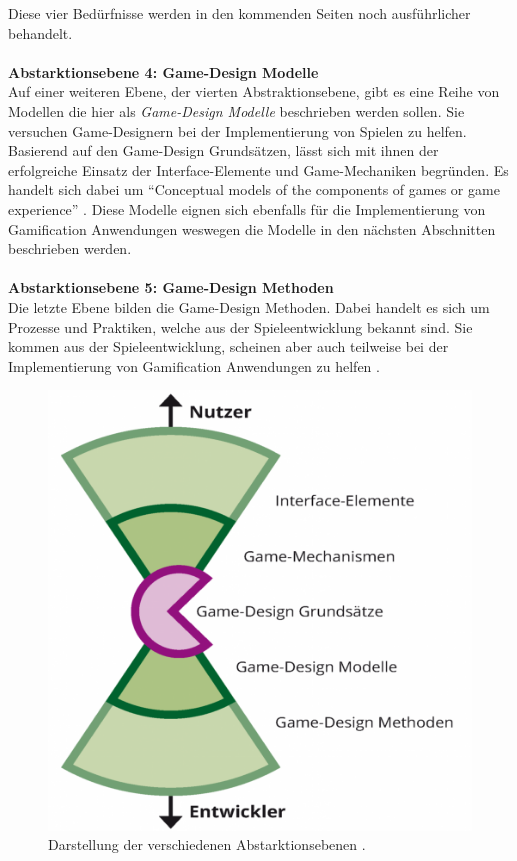 \documentclass[a4paper,12pt]{scrartcl}
\begin{document}
Diese vier Bedürfnisse werden in den kommenden Seiten noch ausführlicher behandelt.
\\\\
\textbf{Abstarktionsebene 4: Game-Design Modelle}
\\
Auf einer weiteren Ebene, der vierten Abstraktionsebene, gibt es eine Reihe von Modellen die hier als \textit{Game-Design Modelle} beschrieben werden sollen. Sie versuchen Game-Designern bei der Implementierung von Spielen zu helfen. Basierend auf den Game-Design Grundsätzen, lässt sich mit ihnen der erfolgreiche Einsatz der Interface-Elemente und Game-Mechaniken begründen. Es handelt sich dabei um \enquote{Conceptual models of the components of games or game experience} \cite{Deterding2011}. Diese Modelle eignen sich ebenfalls für die Implementierung von Gamification Anwendungen weswegen die Modelle in den nächsten Abschnitten beschrieben werden.
\\\\
\textbf{Abstarktionsebene 5: Game-Design Methoden}\\
Die letzte Ebene bilden die Game-Design Methoden. Dabei handelt es sich um Prozesse und Praktiken, welche aus der Spieleentwicklung bekannt sind. Sie kommen aus der Spieleentwicklung, scheinen aber auch teilweise bei der Implementierung von Gamification Anwendungen zu helfen \cite{GameElemente2018}.
\\
\begin{figure}[h!]
\begin{center}
\includegraphics[scale = 0.3]{Bilder/GameElemente.eps}
\caption{Darstellung der verschiedenen Abstarktionsebenen \cite{GameElemente2018}.}
\label{GameElementeBild}
\end{center}
\end{figure}
\end{document}
